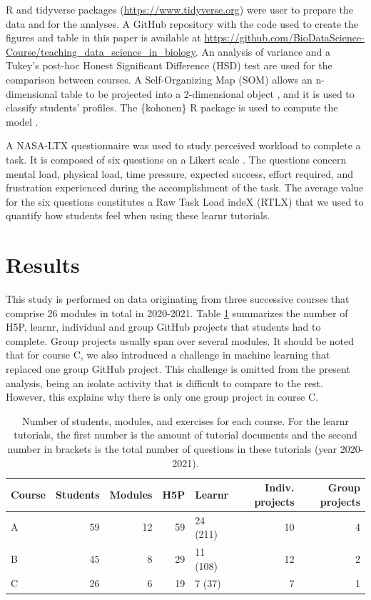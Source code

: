 \documentclass{aims}
\theoremstyle{definition}
\begin{document}
R and tidyverse \cite{Wickham2019} packages
(\url{https://www.tidyverse.org}) were user to prepare the data and for
the analyses. A GitHub repository with the code used to create the
figures and table in this paper is available at
\url{https://github.com/BioDataScience-Course/teaching_data_science_in_biology}.
An analysis of variance and a Tukey's post-hoc Honest Significant
Difference (HSD) test are used for the comparison between courses. A
Self-Organizing Map (SOM) allows an n-dimensional table to be projected
into a 2-dimensional object \cite{Kohonen1995}, and it is used to
classify students' profiles. The \{kohonen\} R package is used to
compute the model \cite{Wehrens2018}.

A NASA-LTX questionnaire was used to study perceived workload to
complete a task. It is composed of six questions on a Likert scale
\cite{Hart1988}. The questions concern mental load, physical load, time
pressure, expected success, effort required, and frustration experienced
during the accomplishment of the task. The average value for the six
questions constitutes a Raw Task Load indeX (RTLX) \cite{Byers1989} that
we used to quantify how students feel when using these learnr tutorials.

\hypertarget{results}{%
\section{Results}\label{results}}

This study is performed on data originating from three successive
courses that comprise 26 modules in total in 2020-2021. Table
\ref {tab:tab_course} summarizes the number of H5P, learnr, individual
and group GitHub projects that students had to complete. Group projects
usually span over several modules. It should be noted that for course C,
we also introduced a challenge in machine learning that replaced one
group GitHub project. This challenge is omitted from the present
analysis, being an isolate activity that is difficult to compare to the
rest. However, this explains why there is only one group project in
course C.

\begin{table}

\caption{\label{tab:tab_course_summary}\label{tab:tab_course} Number of students, modules, and exercises for each course. For the learnr tutorials, the first number is the amount of tutorial documents and the second number in brackets is the total number of questions in these tutorials (year 2020-2021).}
\centering
\begin{tabular}[t]{l|r|r|r|l|r|r}
\hline
Course & Students & Modules & H5P & Learnr & Indiv. projects & Group projects\\
\hline
A & 59 & 12 & 59 & 24 (211) & 10 & 4\\
\hline
B & 45 & 8 & 29 & 11 (108) & 12 & 2\\
\hline
C & 26 & 6 & 19 & 7 (37) & 7 & 1\\
\hline
\end{tabular}
\end{table}
\end{document}
